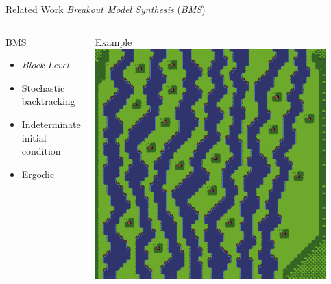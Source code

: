 \documentclass{beamer}
\begin{document}
  \begin{frame}[fragile]{Related Work}
    \textit{Breakout Model Synthesis} (\textit{BMS})
    \begin{columns}[T,onlytextwidth]
        \begin{block}{BMS}
          \hfill \\
          \begin{itemize}
            \item \textit{Block Level}
            \item Stochastic backtracking
            \item Indeterminate initial condition
            \item Ergodic
          \end{itemize}
        \end{block}
        \begin{block}{Example}
          \includegraphics[width=0.9\textwidth]{img/forestmicro_64x64.pdf}
        \end{block}
    \end{columns}
  \end{frame}

\end{document}
